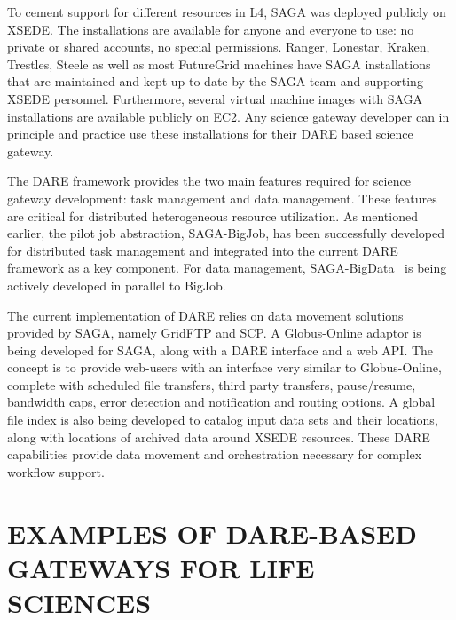 \documentclass[]{svjour3}
\begin{document}
To cement support for different resources in L4, SAGA was deployed
publicly on XSEDE. The installations are available for anyone and
everyone to use: no private or shared accounts, no special
permissions. Ranger, Lonestar, Kraken, Trestles, Steele as well as
most FutureGrid machines have SAGA installations that are maintained
and kept up to date by the SAGA team and supporting XSEDE
personnel. Furthermore, several virtual machine images with SAGA
installations are available publicly on EC2. Any science gateway
developer can in principle and practice use these installations for
their DARE based science gateway.

The DARE framework provides the two main features required
for science gateway development: task management and data management.
These features are critical for distributed heterogeneous resource
utilization. As mentioned earlier, the pilot
job abstraction, SAGA-BigJob, has been successfully developed for
distributed task management and integrated into the current DARE
framework as a key component. For data management, SAGA-BigData~\cite{pstar11} is
being actively developed in parallel to BigJob.

The current implementation of DARE relies on data movement solutions
provided by SAGA, namely GridFTP and SCP. A Globus-Online adaptor is
being developed for SAGA, along with a DARE interface and a web
API. The concept is to provide web-users with an interface very
similar to Globus-Online, complete with scheduled file transfers,
third party transfers, pause/resume, bandwidth caps, error detection
and notification and routing options. A global file index is also
being developed to catalog input data sets and their locations, along
with locations of archived data around XSEDE resources. These DARE
capabilities provide data movement and orchestration necessary for
complex workflow support.





\section{EXAMPLES OF DARE-BASED GATEWAYS FOR LIFE SCIENCES}
\end{document}
